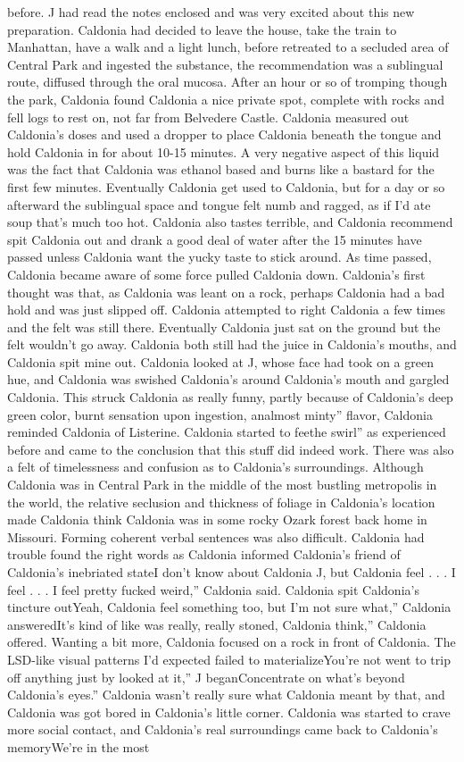 \documentclass[12pt]{book}
\begin{document}
before. J had read the notes enclosed and was very excited about this new preparation. Caldonia had decided to leave the house, take the train to Manhattan, have a walk and a light lunch, before retreated to a secluded area of Central Park and ingested the substance, the recommendation was a sublingual route, diffused through the oral mucosa. After an hour or so of tromping though the park, Caldonia found Caldonia a nice private spot, complete with rocks and fell logs to rest on, not far from Belvedere Castle. Caldonia measured out Caldonia's doses and used a dropper to place Caldonia beneath the tongue and hold Caldonia in for about 10-15 minutes. A very negative aspect of this liquid was the fact that Caldonia was ethanol based and burns like a bastard for the first few minutes. Eventually Caldonia get used to Caldonia, but for a day or so afterward the sublingual space and tongue felt numb and ragged, as if I'd ate soup that's much too hot. Caldonia also tastes terrible, and Caldonia recommend spit Caldonia out and drank a good deal of water after the 15 minutes have passed unless Caldonia want the yucky taste to stick around. As time passed, Caldonia became aware of some force pulled Caldonia down. Caldonia's first thought was that, as Caldonia was leant on a rock, perhaps Caldonia had a bad hold and was just slipped off. Caldonia attempted to right Caldonia a few times and the felt was still there. Eventually Caldonia just sat on the ground but the felt wouldn't go away. Caldonia both still had the juice in Caldonia's mouths, and Caldonia spit mine out. Caldonia looked at J, whose face had took on a green hue, and Caldonia was swished Caldonia's around Caldonia's mouth and gargled Caldonia. This struck Caldonia as really funny, partly because of Caldonia's deep green color, burnt sensation upon ingestion, analmost minty'' flavor, Caldonia reminded Caldonia of Listerine. Caldonia started to feethe swirl'' as experienced before and came to the conclusion that this stuff did indeed work. There was also a felt of timelessness and confusion as to Caldonia's surroundings. Although Caldonia was in Central Park in the middle of the most bustling metropolis in the world, the relative seclusion and thickness of foliage in Caldonia's location made Caldonia think Caldonia was in some rocky Ozark forest back home in Missouri. Forming coherent verbal sentences was also difficult. Caldonia had trouble found the right words as Caldonia informed Caldonia's friend of Caldonia's inebriated stateI don't know about Caldonia J, but Caldonia feel . . . I feel . . . I feel pretty fucked weird,'' Caldonia said. Caldonia spit Caldonia's tincture outYeah, Caldonia feel something too, but I'm not sure what,'' Caldonia answeredIt's kind of like was really, really stoned, Caldonia think,'' Caldonia offered. Wanting a bit more, Caldonia focused on a rock in front of Caldonia. The LSD-like visual patterns I'd expected failed to materializeYou're not went to trip off anything just by looked at it,'' J beganConcentrate on what's beyond Caldonia's eyes.'' Caldonia wasn't really sure what Caldonia meant by that, and Caldonia was got bored in Caldonia's little corner. Caldonia was started to crave more social contact, and Caldonia's real surroundings came back to Caldonia's memoryWe're in the most 
\end{document}
